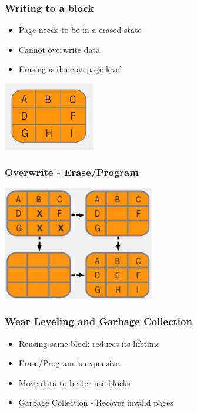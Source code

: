 \documentclass{beamer}
\begin{document}
\begin{frame}
  \frametitle{Writing to a block}
  \begin{itemize}
    \item Page needs to be in a erased state
    \item Cannot overwrite data
    \item Erasing is done at page level
  \end{itemize}
  \begin{center}
  \includegraphics[width=150px]{principles_4.png}
  \end{center}
\end{frame}

\begin{frame}
  \frametitle{Overwrite - Erase/Program}
  \begin{center}
  \includegraphics[width=250px]{principles_5.png}
  \end{center}
\end{frame}

\begin{frame}
  \frametitle{Wear Leveling and Garbage Collection}
  \begin{itemize}
    \item Reusing same block reduces its lifetime
    \item Erase/Program is expensive
    \item Move data to better use blocks
    \item Garbage Collection - Recover invalid pages
  \end{itemize}
\end{frame}
\end{document}
